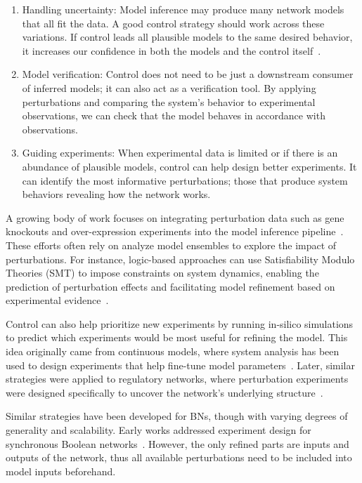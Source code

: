 \begin{enumerate}
    \item Handling uncertainty: Model inference may produce many network models that all fit the data. A good control strategy should work across these variations. If control leads all plausible models to the same desired behavior, it increases our confidence in both the models and the control itself~\cite{Chevalier2025}.
    \item Model verification: Control does not need to be just a downstream consumer of inferred models; it can also act as a verification tool. By applying perturbations and comparing the system's behavior to experimental observations, we can check that the model behaves in accordance with observations.
    \item Guiding experiments: When experimental data is limited or if there is an abundance of plausible models, control can help design better experiments. It can identify the most informative perturbations; those that produce system behaviors revealing how the network works.
\end{enumerate}

A growing body of work focuses on integrating perturbation data such as gene knockouts and over-expression experiments into the model inference pipeline~\cite{Gjerga2020,Yordanov2016,Park2025}. These efforts often rely on analyze model ensembles to explore the impact of perturbations. For instance, logic-based approaches can use Satisfiability Modulo Theories (SMT) to impose constraints on system dynamics, enabling the prediction of perturbation effects and facilitating model refinement based on experimental evidence~\cite{Yordanov2016}.

Control can also help prioritize new experiments by running in-silico simulations to predict which experiments would be most useful for refining the model. This idea originally came from continuous models, where system analysis has been used to design experiments that help fine-tune model parameters~\cite{Kreutz2009, Melykuti2010}. Later, similar strategies were applied to regulatory networks, where perturbation experiments were designed specifically to uncover the network's underlying structure~\cite{UdDean2016}.

Similar strategies have been developed for BNs, though with varying degrees of generality and scalability. Early works addressed experiment design for synchronous Boolean networks~\cite{Videla2015}. However, the only refined parts are inputs and outputs of the network, thus all available perturbations need to be included into model inputs beforehand.


